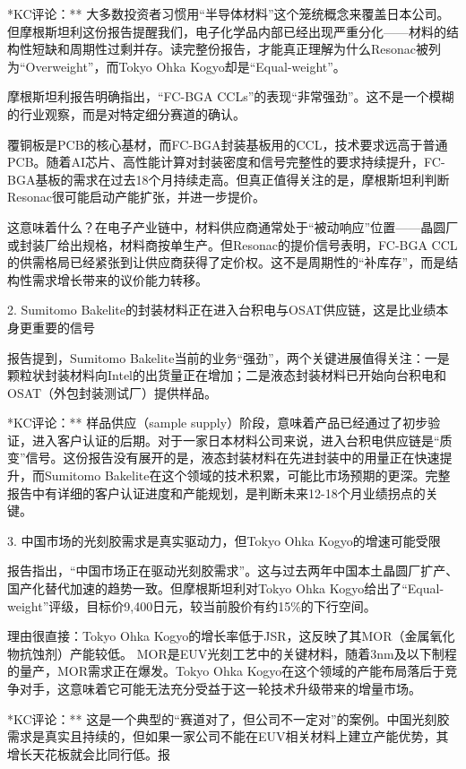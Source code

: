 \documentclass[11pt]{ctexart}
\begin{document}
*KC评论：** 大多数投资者习惯用“半导体材料”这个笼统概念来覆盖日本公司。但摩根斯坦利这份报告提醒我们，电子化学品内部已经出现严重分化——材料的结构性短缺和周期性过剩并存。读完整份报告，才能真正理解为什么Resonac被列为“Overweight”，而Tokyo Ohka Kogyo却是“Equal-weight”。

摩根斯坦利报告明确指出，“FC-BGA CCLs”的表现“非常强劲”。这不是一个模糊的行业观察，而是对特定细分赛道的确认。

覆铜板是PCB的核心基材，而FC-BGA封装基板用的CCL，技术要求远高于普通PCB。随着AI芯片、高性能计算对封装密度和信号完整性的要求持续提升，FC-BGA基板的需求在过去18个月持续走高。但真正值得关注的是，摩根斯坦利判断Resonac很可能启动产能扩张，并进一步提价。

这意味着什么？在电子产业链中，材料供应商通常处于“被动响应”位置——晶圆厂或封装厂给出规格，材料商按单生产。但Resonac的提价信号表明，FC-BGA CCL的供需格局已经紧张到让供应商获得了定价权。这不是周期性的“补库存”，而是结构性需求增长带来的议价能力转移。

2. Sumitomo Bakelite的封装材料正在进入台积电与OSAT供应链，这是比业绩本身更重要的信号

报告提到，Sumitomo Bakelite当前的业务“强劲”，两个关键进展值得关注：一是颗粒状封装材料向Intel的出货量正在增加；二是液态封装材料已开始向台积电和OSAT（外包封装测试厂）提供样品。

*KC评论：** 样品供应（sample supply）阶段，意味着产品已经通过了初步验证，进入客户认证的后期。对于一家日本材料公司来说，进入台积电供应链是“质变”信号。这份报告没有展开的是，液态封装材料在先进封装中的用量正在快速提升，而Sumitomo Bakelite在这个领域的技术积累，可能比市场预期的更深。完整报告中有详细的客户认证进度和产能规划，是判断未来12-18个月业绩拐点的关键。

3. 中国市场的光刻胶需求是真实驱动力，但Tokyo Ohka Kogyo的增速可能受限

报告指出，“中国市场正在驱动光刻胶需求”。这与过去两年中国本土晶圆厂扩产、国产化替代加速的趋势一致。但摩根斯坦利对Tokyo Ohka Kogyo给出了“Equal-weight”评级，目标价9,400日元，较当前股价有约15\%的下行空间。

理由很直接：Tokyo Ohka Kogyo的增长率低于JSR，这反映了其MOR（金属氧化物抗蚀剂）产能较低。 MOR是EUV光刻工艺中的关键材料，随着3nm及以下制程的量产，MOR需求正在爆发。Tokyo Ohka Kogyo在这个领域的产能布局落后于竞争对手，这意味着它可能无法充分受益于这一轮技术升级带来的增量市场。

*KC评论：** 这是一个典型的“赛道对了，但公司不一定对”的案例。中国光刻胶需求是真实且持续的，但如果一家公司不能在EUV相关材料上建立产能优势，其增长天花板就会比同行低。报
\end{document}
